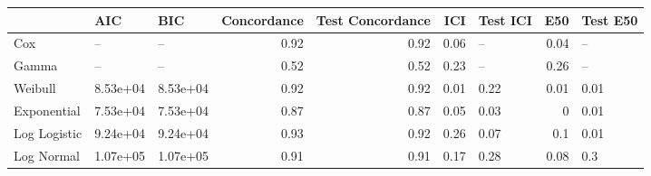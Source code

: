 \begin{table*}
\centering
\label{tab:afr_models}
\begin{tabular}{lllrrrlrl}
\toprule
 & AIC & BIC & Concordance & Test Concordance & ICI & Test ICI & E50 & Test E50 \\
\midrule
Cox & -- & -- & 0.92 & 0.92 & 0.06 & -- & 0.04 & -- \\
Gamma & -- & -- & 0.52 & 0.52 & 0.23 & -- & 0.26 & -- \\
Weibull & 8.53e+04 & 8.53e+04 & 0.92 & 0.92 & 0.01 & 0.22 & 0.01 & 0.01 \\
Exponential & 7.53e+04 & 7.53e+04 & 0.87 & 0.87 & 0.05 & 0.03 & 0 & 0.01 \\
Log Logistic & 9.24e+04 & 9.24e+04 & 0.93 & 0.92 & 0.26 & 0.07 & 0.1 & 0.01 \\
Log Normal & 1.07e+05 & 1.07e+05 & 0.91 & 0.91 & 0.17 & 0.28 & 0.08 & 0.3 \\
\bottomrule
\end{tabular}
\end{table*}
